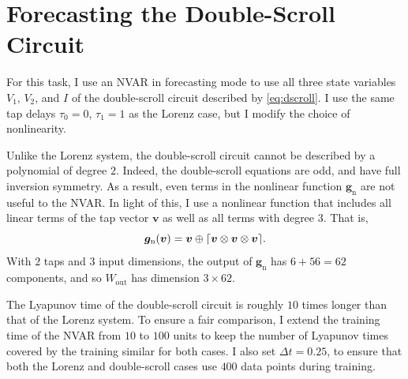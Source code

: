 \section{Forecasting the Double-Scroll Circuit}

For this task, I use an NVAR in forecasting mode to use all
three state variables $V_1$, $V_2$, and $I$ of the double-scroll
circuit described by \cref{eq:dscroll}. I use the same tap
delays $\tau_0 = 0$, $\tau_1 = 1$ as the Lorenz case, but I modify
the choice of nonlinearity.

Unlike the Lorenz system, the double-scroll circuit cannot be
described by a polynomial of degree $2$. Indeed, the double-scroll
equations are odd, and have full inversion
symmetry. As a result, even terms in the nonlinear function
$\bm{g}_\text{n}$ are not useful to the NVAR. In light of this, I use
a nonlinear function that includes all linear terms of the tap vector
$\bm{v}$ as well as all terms with degree $3$. That is,
\begin{equation}
  \bm{g}_\text{n}(\bm{v}) = \bm{v} \oplus \lceil\bm{v} \otimes \bm{v} \otimes \bm{v}\rceil.
\end{equation}
With $2$ taps and $3$ input dimensions, the output of
$\bm{g}_\text{n}$ has $6 + 56 = 62$ components, and so $W_\text{out}$
has dimension $3 \times 62$.

The Lyapunov time of the double-scroll circuit is roughly $10$ times
longer than that of the Lorenz system. To ensure a fair comparison, I
extend the training time of the NVAR from $10$ to $100$ units to keep
the number of Lyapunov times covered by the training similar for both
cases. I also set $\Delta t = 0.25$, to ensure that both the Lorenz
and double-scroll cases use $400$ data points during training.

